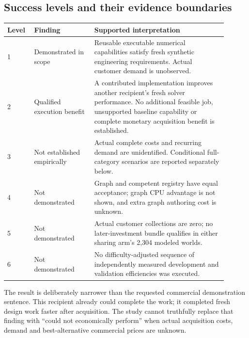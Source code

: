 \subsection{Success levels and their evidence boundaries}

\begin{center}
\small
\begin{tabular}{p{0.10\linewidth}p{0.25\linewidth}p{0.55\linewidth}}
\toprule
Level & Finding & Supported interpretation\\
\midrule
1 & Demonstrated in scope & Reusable executable numerical capabilities satisfy fresh synthetic engineering requirements. Actual customer demand is unobserved.\\[4pt]
2 & Qualified execution benefit & A contributed implementation improves another recipient's fresh solver performance. No additional feasible job, unsupported baseline capability or complete monetary acquisition benefit is established.\\[4pt]
3 & Not established empirically & Actual complete costs and recurring demand are unidentified. Conditional full-category scenarios are reported separately below.\\[4pt]
4 & Not demonstrated & Graph and competent registry have equal acceptance; graph CPU advantage is not shown, and extra graph authoring cost is unknown.\\[4pt]
5 & Not demonstrated & Actual customer collections are zero; no later-investment bundle qualifies in either sharing arm's 2,304 modeled worlds.\\[4pt]
6 & Not demonstrated & No difficulty-adjusted sequence of independently measured development and validation efficiencies was executed.\\
\bottomrule
\end{tabular}
\end{center}

The result is deliberately narrower than the requested commercial demonstration sentence. This recipient already could complete the work; it completed fresh design work faster after acquisition. The study cannot truthfully replace that finding with ``could not economically perform'' when actual acquisition costs, demand and best-alternative commercial prices are unknown.


